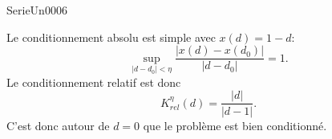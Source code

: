
\begin{corrige}{SerieUn0006}

	Le conditionnement absolu est simple avec $x(d)=1-d$:
	\begin{equation}
		\sup_{| d-d_0 |<\eta}\frac{ |x(d)-x(d_0)| }{ | d-d_0 | }=1.
	\end{equation}
	Le conditionnement relatif est donc
	\begin{equation}
		K_{rel}^{\eta}(d)=\frac{ |d| }{ |d-1| }.
	\end{equation}
	C'est donc autour de $d=0$ que le problème est bien conditionné.

\end{corrige}
